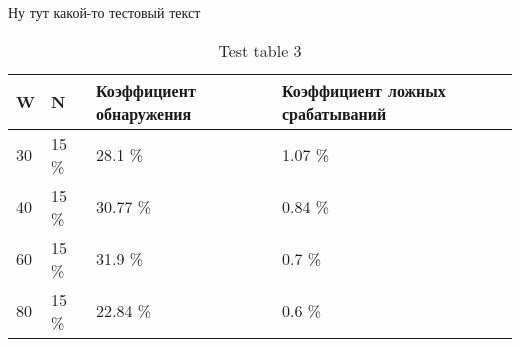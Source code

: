 \documentclass[12pt,a4paper]{article}
\begin{document}
Ну тут какой-то тестовый текст

\begin{table}
	\caption{Test table 3}
	\label{table:fix_n}
	\begin{center}
		\begin{tabular}{|l|l|l|l|}
		\hline

		\hline
		\textbf{W} & \textbf{N} & \textbf{Коэффициент обнаружения} & \textbf{Коэффициент ложных срабатываний} \\
		\hline 30 & 15 \% & 28.1  \% & 1.07 \% \\
		\hline 40 & 15 \% & 30.77 \% & 0.84 \% \\
		\hline 60 & 15 \% & 31.9  \% & 0.7  \% \\
		\hline 80 & 15 \% & 22.84 \% & 0.6  \% \\
		\hline

		\hline
		\end{tabular}
	\end{center}
\end{table}
\end{document}

